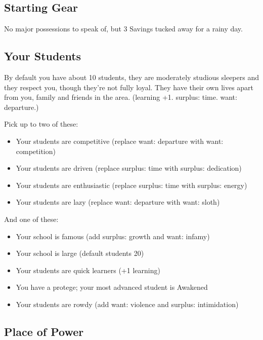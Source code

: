 \documentclass[
  oneside,
  statementpaper,
  9pt]{memoir}
\begin{document}
\hypertarget{starting-gear-3}{%
\subsection{Starting Gear}\label{starting-gear-3}}

No major possessions to speak of, but 3 Savings tucked away for a rainy
day.

\hypertarget{your-students}{%
\subsection{Your Students}\label{your-students}}

By default you have about 10 students, they are moderately studious
sleepers and they respect you, though they're not fully loyal. They have
their own lives apart from you, family and friends in the area.
(learning +1. surplus: time. want: departure.)

Pick up to two of these:

\begin{itemize}
\tightlist
\item
  Your students are competitive (replace want: departure with want:
  competition)
\item
  Your students are driven (replace surplus: time with surplus:
  dedication)
\item
  Your students are enthusiastic (replace surplus: time with surplus:
  energy)
\item
  Your students are lazy (replace want: departure with want: sloth)
\end{itemize}

And one of these:

\begin{itemize}
\tightlist
\item
  Your school is famous (add surplus: growth and want: infamy)
\item
  Your school is large (default students 20)
\item
  Your students are quick learners (+1 learning)
\item
  You have a protege; your most advanced student is Awakened
\item
  Your students are rowdy (add want: violence and surplus: intimidation)
\end{itemize}

\hypertarget{place-of-power-3}{%
\subsection{Place of Power}\label{place-of-power-3}}
\end{document}
